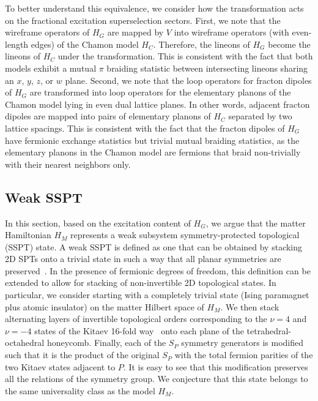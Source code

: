 \documentclass[prx,twocolumn,superscriptaddress,nofootinbib,showpacs,notitlepage]{revtex4-2}
\begin{document}
To better understand this equivalence, we consider how the transformation acts on the fractional excitation superselection sectors. First, we note that the wireframe operators of $H_G$ are mapped by $V$ into wireframe operators (with even-length edges) of the Chamon model $H_C$. Therefore, the lineons of $H_G$ become the lineons of $H_C$ under the transformation. This is consistent with the fact that both models exhibit a mutual $\pi$ braiding statistic between intersecting lineons sharing an $x$, $y$, $z$, or $w$ plane. Second, we note that the loop operators for fracton dipoles of $H_G$ are transformed into loop operators for the elementary planons of the Chamon model lying in even dual lattice planes. In other words, adjacent fracton dipoles are mapped into pairs of elementary planons of $H_C$ separated by two lattice spacings. This is consistent with the fact that the fracton dipoles of $H_G$ have fermionic exchange statistics but trivial mutual braiding statistics, as the elementary planons in the Chamon model are fermions that braid non-trivially with their nearest neighbors only.

\subsection{Weak SSPT}

In this section, based on the excitation content of $H_G$, we argue that the matter Hamiltonian $H_M$ represents a weak subsystem symmetry-protected topological (SSPT) state. A weak SSPT is defined as one that can be obtained by stacking 2D SPTs onto a trivial state in such a way that all planar symmetries are preserved~\cite{subsystemphaserel,Devakul_2020}. In the presence of fermionic degrees of freedom, this definition can be extended to allow for stacking of non-invertible 2D topological states. In particular, we consider starting with a completely trivial state (Ising paramagnet plus atomic insulator) on the matter Hilbert space of $H_M$. We then stack alternating layers of invertible topological orders corresponding to the $\nu=4$ and $\nu=-4$ states of the Kitaev 16-fold way~\cite{kitaev2006anyons} onto each plane of the tetrahedral-octahedral honeycomb. Finally, each of the $S_P$ symmetry generators is modified such that it is the product of the original $S_P$ with the total fermion parities of the two Kitaev states adjacent to $P$. It is easy to see that this modification preserves all the relations of the symmetry group. We conjecture that this state belongs to the same universality class as the model $H_M$.
\end{document}
